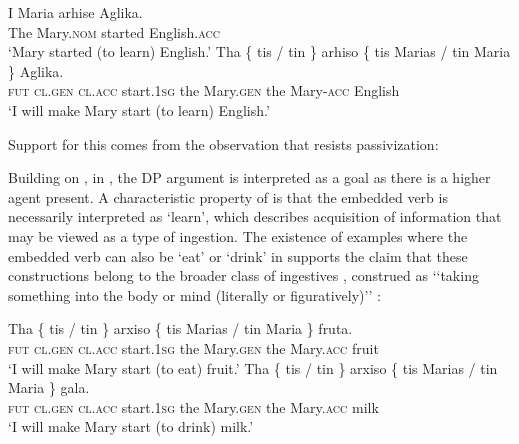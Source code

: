 \documentclass[output=paper]{langscibook}
\begin{document}
\ea \label{alexiadouex:key:8}
    \ea
        \gll I Maria    arhise    Aglika. \\
        The Mary.\textsc{nom}  started    English.\textsc{acc} \\
        \glt ‘Mary started (to learn) English.’
    \ex
        \gll Tha  \{ tis / tin \} arhiso  \{ tis Marias / tin Maria \} Aglika.\\
        \textsc{fut} {} \textsc{cl.gen} {} \textsc{cl.acc} {} start.\textsc{1sg} {} the Mary.\textsc{gen} {} the Mary-\textsc{acc} {} English\\
        \glt `I will make Mary start (to learn) English.'
    \z 
\z

Support for this comes from the observation that  resists passivization:

\z 

Building on \citet{Anagnostopoulou2001}, in , the DP argument is interpreted as a goal as there is a higher agent present. 
A characteristic property of  is that the embedded verb is necessarily interpreted as ‘learn’, 
which describes acquisition of information that may be viewed as a type of ingestion. 
The existence of examples where the embedded verb can also be ‘eat’ or ‘drink’ in  supports the claim 
that these constructions belong to the broader class of ingestives \citep[213--217]{Levin1993}, 
construed as ‘‘taking something into the body or mind (literally or figuratively)’’ \citep[46]{Masica1976}:

\ea%
    \label{alexiadouex:key:9}
    \ea
        \gll Tha  \{ tis / tin \} arxiso \{ tis Marias / tin Maria \} fruta.\\
        \textsc{fut} {} \textsc{cl.gen} {} \textsc{cl.acc} {} start.\textsc{1sg} {} the Mary.\textsc{gen} {} the Mary.\textsc{acc} {} fruit\\
        \glt  ‘I will make Mary start (to eat) fruit.’
    \ex
        \gll Tha \{ tis / tin \} arxiso \{ tis Marias / tin Maria \} gala.\\
        \textsc{fut} {} \textsc{cl.gen} {} \textsc{cl.acc} {} start.\textsc{1sg} {} the Mary.\textsc{gen} {} the Mary.\textsc{acc} {} milk\\
        \glt ‘I will make Mary start (to drink) milk.’
    \z 
\z 
\end{document}
